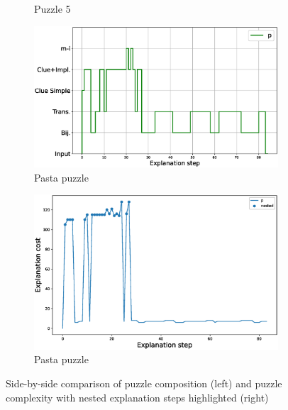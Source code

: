 \begin{figure}[t!]
\begin{subfigure}{.5\textwidth}
		\caption{Puzzle 5 }
		\label{fig:cost_puzzle:p5}
	\end{subfigure}
	\begin{subfigure}{.5\textwidth}
		\centering
		\includegraphics[width=0.9\linewidth]{figures/plot_cost_steps_p.eps}
		\caption{Pasta puzzle}
		\label{fig:composition_puzzle:pasta}
	\end{subfigure}%
	\begin{subfigure}{.5\textwidth}
		\centering
		\includegraphics[width=0.84\linewidth]{figures/p.eps}
		\caption{Pasta puzzle}
		\label{fig:cost_puzzle:pasta}
	\end{subfigure}
	\caption{Side-by-side comparison of puzzle composition (left) and puzzle complexity with nested explanation steps highlighted (right)}
	\label{fig:steps}
\end{figure}
